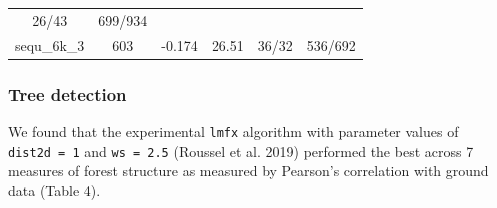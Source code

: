 \documentclass[]{article}
\begin{document}
\begin{longtable}[]{@{}cccccc@{}}
\begin{minipage}[t]{0.18\columnwidth}
26/43\strut
\end{minipage} & \begin{minipage}[t]{0.22\columnwidth}\centering\strut
699/934\strut
\end{minipage}\tabularnewline
\begin{minipage}[t]{0.11\columnwidth}\centering\strut
sequ\_6k\_3\strut
\end{minipage} & \begin{minipage}[t]{0.07\columnwidth}\centering\strut
603\strut
\end{minipage} & \begin{minipage}[t]{0.11\columnwidth}\centering\strut
-0.174\strut
\end{minipage} & \begin{minipage}[t]{0.13\columnwidth}\centering\strut
26.51\strut
\end{minipage} & \begin{minipage}[t]{0.18\columnwidth}\centering\strut
36/32\strut
\end{minipage} & \begin{minipage}[t]{0.22\columnwidth}\centering\strut
536/692\strut
\end{minipage}\tabularnewline
\bottomrule
\end{longtable}

\subsubsection{Tree detection}\label{tree-detection-1}

We found that the experimental \texttt{lmfx} algorithm with parameter
values of \texttt{dist2d\ =\ 1} and \texttt{ws\ =\ 2.5} (Roussel et al.
2019) performed the best across 7 measures of forest structure as
measured by Pearson's correlation with ground data (Table 4).
\end{document}

